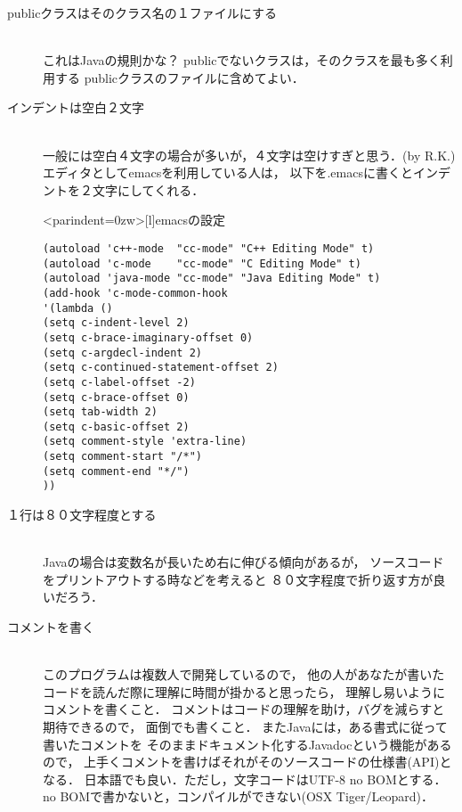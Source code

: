 \documentclass[a4j,openany]{jbook}
\begin{document}
  \begin{description}
   \item[publicクラスはそのクラス名の１ファイルにする] \mbox{} \\
              これはJavaの規則かな？
              publicでないクラスは，そのクラスを最も多く利用する
              publicクラスのファイルに含めてよい．
   \item[インデントは空白２文字] \mbox{} \\
              一般には空白４文字の場合が多いが，４文字は空けすぎと思う．(by R.K.)
              エディタとしてemacsを利用している人は，
              以下を.emacsに書くとインデントを２文字にしてくれる．

              \begin{breakitembox}<parindent=0zw>[l]{emacsの設定}
\begin{verbatim}
(autoload 'c++-mode  "cc-mode" "C++ Editing Mode" t)
(autoload 'c-mode    "cc-mode" "C Editing Mode" t)
(autoload 'java-mode "cc-mode" "Java Editing Mode" t)
(add-hook 'c-mode-common-hook
'(lambda ()
(setq c-indent-level 2)
(setq c-brace-imaginary-offset 0)
(setq c-argdecl-indent 2)
(setq c-continued-statement-offset 2)
(setq c-label-offset -2)
(setq c-brace-offset 0)
(setq tab-width 2)
(setq c-basic-offset 2)
(setq comment-style 'extra-line)
(setq comment-start "/*")
(setq comment-end "*/")
))
\end{verbatim}
              \end{breakitembox}
   \item[１行は８０文字程度とする] \mbox{} \\
              Javaの場合は変数名が長いため右に伸びる傾向があるが，
              ソースコードをプリントアウトする時などを考えると
              ８０文字程度で折り返す方が良いだろう．
   \item[コメントを書く] \mbox{} \\
              このプログラムは複数人で開発しているので，
              他の人があなたが書いたコードを読んだ際に理解に時間が掛かると思ったら，
              理解し易いようにコメントを書くこと．
              コメントはコードの理解を助け，バグを減らすと期待できるので，
              面倒でも書くこと．
              またJavaには，ある書式に従って書いたコメントを
              そのままドキュメント化するJavadocという機能があるので，
              上手くコメントを書けばそれがそのソースコードの仕様書(API)となる．
              日本語でも良い．ただし，文字コードはUTF-8 no BOMとする．
              no BOMで書かないと，コンパイルができない(OSX Tiger/Leopard)．

\end{description}
\end{document}
